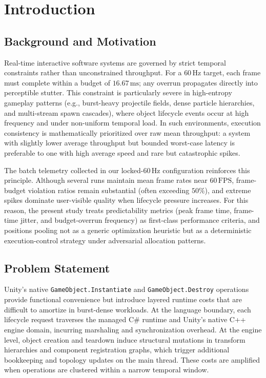 \documentclass[11pt]{article}
\begin{document}
\section{Introduction}

\subsection{Background and Motivation}

Real-time interactive software systems are governed by strict temporal constraints rather than unconstrained throughput. For a \(60\,\mathrm{Hz}\) target, each frame must complete within a budget of \(16.67\,\mathrm{ms}\); any overrun propagates directly into perceptible stutter. This constraint is particularly severe in high-entropy gameplay patterns (e.g., burst-heavy projectile fields, dense particle hierarchies, and multi-stream spawn cascades), where object lifecycle events occur at high frequency and under non-uniform temporal load. In such environments, execution consistency is mathematically prioritized over raw mean throughput: a system with slightly lower average throughput but bounded worst-case latency is preferable to one with high average speed and rare but catastrophic spikes.

The batch telemetry collected in our locked-\(60\,\mathrm{Hz}\) configuration reinforces this principle. Although several runs maintain mean frame rates near \(60\,\mathrm{FPS}\), frame-budget violation ratios remain substantial (often exceeding \(50\%\)), and extreme spikes dominate user-visible quality when lifecycle pressure increases. For this reason, the present study treats predictability metrics (peak frame time, frame-time jitter, and budget-overrun frequency) as first-class performance criteria, and positions pooling not as a generic optimization heuristic but as a deterministic execution-control strategy under adversarial allocation patterns.

\subsection{Problem Statement}

Unity's native \texttt{GameObject.Instantiate} and \texttt{GameObject.Destroy} operations provide functional convenience but introduce layered runtime costs that are difficult to amortize in burst-dense workloads. At the language boundary, each lifecycle request traverses the managed C\# runtime and Unity's native C++ engine domain, incurring marshaling and synchronization overhead. At the engine level, object creation and teardown induce structural mutations in transform hierarchies and component registration graphs, which trigger additional bookkeeping and topology updates on the main thread. These costs are amplified when operations are clustered within a narrow temporal window.
\end{document}

